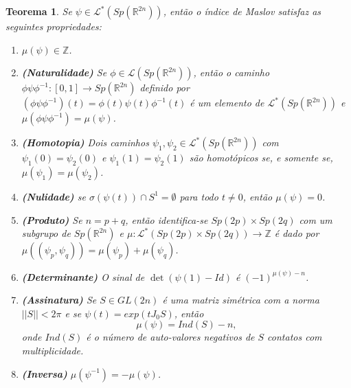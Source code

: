 \documentclass[12pt]{book}
\newtheorem{teorema}{Teorema}[section]
\newcommand{\caminhosespeciais}[1]{\mathcal{L}^{*}(#1)}
\newcommand{\caminhos}{\mathcal{L}}
\newcommand{\caminhossempontobase}[1]{\caminhos(#1)}
\newcommand{\circulo}{S^{1}}
\newcommand{\dominioMaslov}{\caminhos^{*}(\gruposimpletico{\real{2n}})}
\newcommand{\espectrooperador}[1]{\sigma(#1)}
\newcommand{\estruturacomplexa}{J_{0}}
\newcommand{\gruposimpletico}[1]{Sp(#1)}
\newcommand{\inteiros}{\mathbb{Z}}
\newcommand{\intervalo}{[0,1]}
\newcommand{\real}[1]{\mathbb{R}^{#1}}
\begin{document}
	
	\begin{teorema}\label{teorema_indice_maslov}
		Se $\psi \in \dominioMaslov$, então o índice de Maslov satisfaz as seguintes propriedades:
		\begin{enumerate}
			\item $\mu(\psi) \in \inteiros$.
			
			\item \textbf{(Naturalidade)}\label{item_naturalidade_maslov} Se $\phi\in \caminhossempontobase{\gruposimpletico{\real{2n}}}$, então o caminho $\phi\psi\phi^{-1}: \intervalo \to \gruposimpletico{\real{2n}}$ definido por $(\phi\psi\phi^{-1})(t) = \phi(t)\psi(t)\phi^{-1}(t)$ é um elemento de $\caminhosespeciais{\gruposimpletico{\real{2n}}}$ e $\mu(\phi\psi\phi^{-1}) = \mu(\psi)$.
			
			\item \textbf{(Homotopia)} \label{item_homotopia_caminhos_teorema_indice_maslov} Dois caminhos $\psi_{1}, \psi_{2}\in \dominioMaslov $ com $\psi_{1}(0) = \psi_{2}(0)$ e $\psi_{1}(1) = \psi_{2}(1)$ são homotópicos se, e somente se, $\mu(\psi_{1}) = \mu(\psi_{2})$.
			
			\item \textbf{(Nulidade)} se $\espectrooperador{\psi(t)}\cap \circulo = \emptyset$ para todo $t\neq 0$, então $\mu(\psi) = 0$.
			
			\item \textbf{(Produto)} Se $n=p+q$, então identifica-se $\gruposimpletico{2p}\times \gruposimpletico{2q}$ com um subgrupo de $\gruposimpletico{\real{2n}}$ e $\mu:\caminhosespeciais{\gruposimpletico{2p}\times \gruposimpletico{2q}} \to \inteiros$ é dado por $\mu((\psi_{p}, \psi_{q})) = \mu(\psi_{p})+\mu(\psi_{q})$.
			
			\item \textbf{(Determinante)} O sinal de $ \det(\psi(1)-Id)$ é $(-1)^{\mu(\psi)-n}$.
			
			\item \textbf{(Assinatura)}\label{item_assinatura_maslov} Se $S \in GL(2n)$ é uma matriz simétrica com a norma $||S|| < 2\pi$ e se $\psi(t) = exp(t\estruturacomplexa S)$, então 
			$$
			\mu(\psi) = Ind(S) - n,
			$$
			onde $Ind(S)$ é o número de auto-valores negativos de $S$ contatos com multiplicidade.
			
			\item \textbf{(Inversa)} $\mu(\psi^{-1}) = -\mu(\psi)$.
			
		\end{enumerate}
	\end{teorema}
\end{document}
